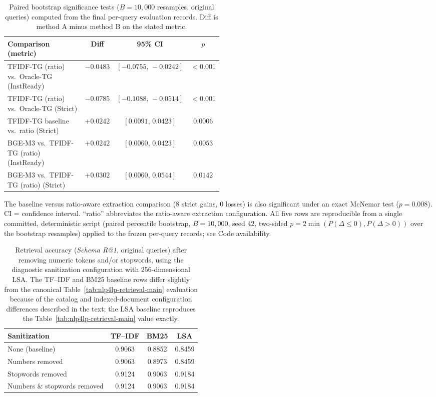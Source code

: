 \documentclass[pdflatex,sn-basic,Numbered]{sn-jnl}
\begin{document}
\begin{table}[t]
\centering
\caption{Paired bootstrap significance tests ($B=10{,}000$ resamples, original queries) computed from the final per-query evaluation records. Diff is method A minus method B on the stated metric.}
\label{tab:nlp4lp-significance}
\small
\setlength{\tabcolsep}{2.5pt}
\begin{tabular}{@{}p{0.50\linewidth}ccc@{}}
  \toprule
  Comparison (metric) & Diff & 95\% CI & $p$ \\
  \midrule
  TFIDF-TG (ratio) vs.\ Oracle-TG (InstReady) & $-0.0483$ & $[-0.0755,\,-0.0242]$ & $<0.001$ \\
  TFIDF-TG (ratio) vs.\ Oracle-TG (Strict) & $-0.0785$ & $[-0.1088,\,-0.0514]$ & $<0.001$ \\
  TFIDF-TG baseline vs.\ ratio (Strict) & $+0.0242$ & $[0.0091,\,0.0423]$ & $0.0006$ \\
  BGE-M3 vs.\ TFIDF-TG (ratio) (InstReady) & $+0.0242$ & $[0.0060,\,0.0423]$ & $0.0053$ \\
  BGE-M3 vs.\ TFIDF-TG (ratio) (Strict) & $+0.0302$ & $[0.0060,\,0.0544]$ & $0.0142$ \\
  \bottomrule
\end{tabular}

\vspace{2mm}
\raggedright
\footnotesize
The baseline versus ratio-aware extraction comparison (8 strict gains, 0 losses) is also significant under an exact McNemar test ($p=0.008$). CI = confidence interval. ``ratio'' abbreviates the ratio-aware extraction configuration. All five rows are reproducible from a single committed, deterministic script (paired percentile bootstrap, $B=10{,}000$, seed $42$, two-sided $p=2\min(P(\Delta\leq 0),P(\Delta>0))$ over the bootstrap resamples) applied to the frozen per-query records; see Code availability.
\end{table}

\begin{table}[t]
\centering
\caption{Retrieval accuracy (\textit{Schema R@1}, original queries) after removing numeric tokens and/or stopwords, using the diagnostic sanitization configuration with 256-dimensional LSA. The TF--IDF and BM25 baseline rows differ slightly from the canonical Table~\ref{tab:nlp4lp-retrieval-main} evaluation because of the catalog and indexed-document configuration differences described in the text; the LSA baseline reproduces the Table~\ref{tab:nlp4lp-retrieval-main} value exactly.}
\label{tab:nlp4lp-overlap}
\small
\begin{tabular}{lccc}
  \toprule
  Sanitization & TF--IDF & BM25 & LSA \\
  \midrule
  None (baseline)               & 0.9063 & 0.8852 & 0.8459 \\
  Numbers removed               & 0.9063 & 0.8973 & 0.8459 \\
  Stopwords removed             & 0.9124 & 0.9063 & 0.9184 \\
  Numbers \& stopwords removed  & 0.9124 & 0.9063 & 0.9184 \\
  \bottomrule
\end{tabular}
\end{table}
\end{document}
